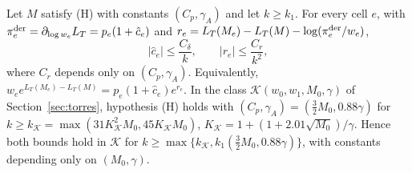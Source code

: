 \begin{teorema}\label{teo:insercion-torres}
Let $M$ satisfy \textup{(H)} with constants $(C_p,\gamma_A)$ and let $k\ge k_1$. For every cell $e$, with
$\pi^{\rm der}_e=\partial_{\log w_e}L_T=p_e(1+\hat c_e)$ and
$r_e=L_T(M_e)-L_T(M)-\log(\pi^{\rm der}_e/w_e)$,
\[
 |\hat c_e|\le\frac{C_\delta}{k},\qquad |r_e|\le\frac{C_r}{k^2},
\]
where $C_r$ depends only on $(C_p,\gamma_A)$. Equivalently, $w_ee^{L_T(M_e)-L_T(M)}=p_e(1+\hat
c_e)e^{r_e}$. In the class $\mathcal K(w_0,w_1,M_0,\gamma)$ of Section~\ref{sec:torres}, hypothesis
\textup{(H)} holds with $(C_p,\gamma_A)=(\tfrac32M_0,0.88\gamma)$ for $k\ge k_{\mathcal K}=
\max(31K_{\mathcal K}^2M_0,45K_{\mathcal K}M_0)$, $K_{\mathcal K}=1+(1+2.01\sqrt{M_0})/\gamma$. Hence both
bounds hold in $\mathcal K$ for $k\ge\max\{k_{\mathcal K},k_1(\tfrac32M_0,0.88\gamma)\}$, with constants
depending only on $(M_0,\gamma)$.
\end{teorema}
